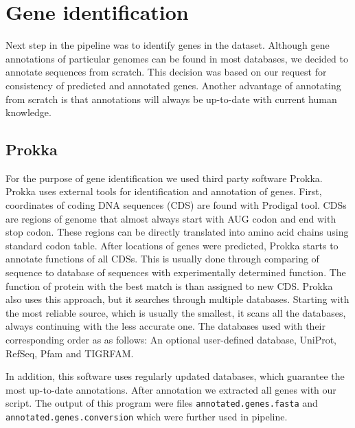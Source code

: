 \section{Gene identification}
Next step in the pipeline was to identify genes in the dataset.
Although gene annotations of particular genomes can be found in most databases, we decided to annotate sequences from scratch.
This decision was based on our request for consistency of predicted and annotated genes.
Another advantage of annotating from scratch is that annotations will always be up-to-date with current human knowledge.

\subsection{Prokka}
For the purpose of gene identification we used third party software Prokka\cite{prokka}.
Prokka uses external tools for identification and annotation of genes.
First, coordinates of coding DNA sequences (CDS) are found with Prodigal tool\cite{prodigal}.
CDSs are regions of genome that almost always start with AUG codon and end with stop codon.
These regions can be directly translated into amino acid chains using standard codon table.
After locations of genes were predicted, Prokka starts to annotate functions of all CDSs.
This is usually done through comparing of sequence to database of sequences with experimentally determined function.
The function of protein with the best match is than assigned to new CDS.
Prokka also uses this approach, but it searches through multiple databases.
Starting with the most reliable source, which is usually the smallest, it scans all the databases, always continuing with the less accurate one.
The databases used with their corresponding order as as follows:
An optional user-defined database,
UniProt\cite{uniprot},
RefSeq\cite{refseq},
Pfam\cite{pfam} and TIGRFAM\cite{tigrfam}.


In addition, this software uses regularly updated databases, which guarantee the most up-to-date annotations.
After annotation we extracted all genes with our script.
The output of this program were files \verb|annotated.genes.fasta| and \verb|annotated.genes.conversion| which were further used in pipeline.

